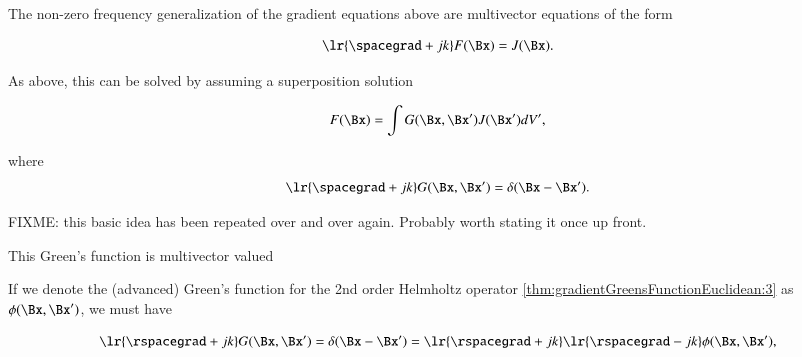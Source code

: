 %
%

The non-zero frequency generalization of the gradient equations above are multivector equations of the form

\begin{dmath}\label{eqn:gradientGreensFunctionEuclidean:660}
\lr{ \spacegrad + j k } F(\Bx) = J(\Bx).
\end{dmath}

As above, this can be solved by assuming a superposition solution

\begin{dmath}\label{eqn:gradientGreensFunctionEuclidean:680}
F(\Bx) = \int G(\Bx, \Bx') J(\Bx') dV',
\end{dmath}

where
\begin{dmath}\label{eqn:gradientGreensFunctionEuclidean:700}
\lr{ \spacegrad + j k } G(\Bx, \Bx')  = \delta(\Bx - \Bx').
\end{dmath}

FIXME: this basic idea has been repeated over and over again.  Probably worth stating it once up front.

This Green's function is multivector valued


If we denote the (advanced) Green's function for the 2nd order Helmholtz operator
\cref{thm:gradientGreensFunctionEuclidean:3}
as \( \phi(\Bx, \Bx') \), we must have

\begin{equation}\label{eqn:gradientGreensFunctionEuclidean:740}
\lr{ \rspacegrad + j k } G(\Bx, \Bx') = \delta(\Bx - \Bx') =
\lr{ \rspacegrad + j k } \lr{ \rspacegrad - j k } \phi(\Bx, \Bx'),
\end{equation}

